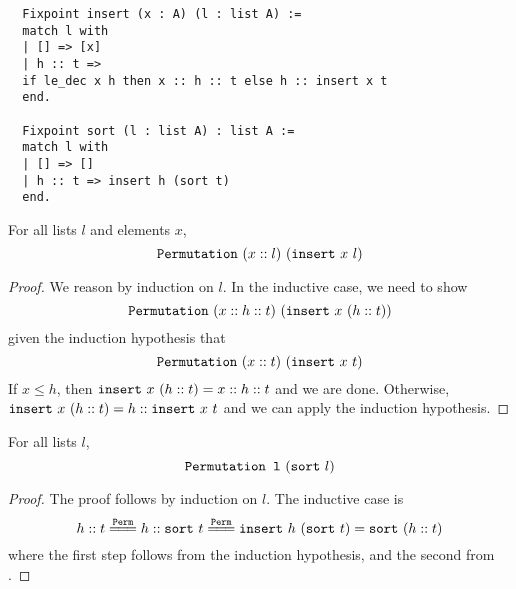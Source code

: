 \documentclass[sigplan,10pt,anonymous,review]{thesis}
\begin{document}
\begin{lstlisting}
  Fixpoint insert (x : A) (l : list A) :=
  match l with
  | [] => [x]
  | h :: t =>
  if le_dec x h then x :: h :: t else h :: insert x t
  end.

  Fixpoint sort (l : list A) : list A :=
  match l with
  | [] => []
  | h :: t => insert h (sort t)
  end.
\end{lstlisting}

\begin{lemma}
  For all lists $l$ and elements $x$,
  \begin{equation*}
    \texttt{\textup{Permutation}}~(x::l)~(\texttt{\textup{insert}}~x~l)
  \end{equation*}
\end{lemma}
\begin{proof}
  We reason by induction on $l$. In the inductive case, we need to show
  \begin{equation*}
    \texttt{\textup{Permutation}}~(x::h::t)~(\texttt{\textup{insert}}~x~(h::t))
  \end{equation*}
  given the induction hypothesis that
  \begin{equation*}
    \texttt{\textup{Permutation}}~(x::t)~(\texttt{\textup{insert}}~x~t)
  \end{equation*}
  If $x \le h$, then $\texttt{\textup{insert}}~x~(h::t) = x :: h :: t$ and we are
  done. Otherwise, $\texttt{\textup{insert}}~x~(h::t) = h :: \texttt{\textup{insert}}~x~t$ and
  we can apply the induction hypothesis.
\end{proof}

\begin{theorem}
  For all lists $l$,
  \begin{equation*}
    \texttt{\textup{Permutation~l}}~(\texttt{\textup{sort}}~l)
  \end{equation*}
\end{theorem}
\begin{proof}
  The proof follows by induction on $l$. The inductive case is
  \begin{equation*}
    h :: t \eqperm h :: \var{sort}~t \eqperm
    \var{insert}~h~(\var{sort}~t) = \var{sort}~(h :: t)
  \end{equation*}
  where the first step follows from the induction hypothesis, and the
  second from .
\end{proof}
\end{document}
